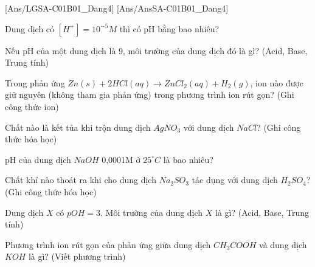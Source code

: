 [Ans/LGSA-C01B01_Dang4]
[Ans/AnsSA-C01B01_Dang4]
\begin{bt}
	Dung dịch có $[H^+] = 10^{-5} M$ thì có pH bằng bao nhiêu?
\end{bt}
\begin{bt}
	Nếu pH của một dung dịch là 9, môi trường của dung dịch đó là gì? (Acid, Base, Trung tính)
\end{bt}
\begin{bt}
    Trong phản ứng $Zn(s) + 2HCl(aq) \rightarrow ZnCl_2(aq) + H_2(g)$, ion nào được giữ nguyên (không tham gia phản ứng) trong phương trình ion rút gọn? (Ghi công thức ion)
\end{bt}
\begin{bt}
    Chất nào là kết tủa khi trộn dung dịch $AgNO_3$ với dung dịch $NaCl$? (Ghi công thức hóa học)
\end{bt}
\begin{bt}
    pH của dung dịch $NaOH$ 0,0001M ở $25^\circ C$ là bao nhiêu?
\end{bt}
\begin{bt}
    Chất khí nào thoát ra khi cho dung dịch $Na_2SO_3$ tác dụng với dung dịch $H_2SO_4$? (Ghi công thức hóa học)
\end{bt}
\begin{bt}
    Dung dịch $X$ có $pOH = 3$. Môi trường của dung dịch $X$ là gì? (Acid, Base, Trung tính)
\end{bt}
\begin{bt}
    Phương trình ion rút gọn của phản ứng giữa dung dịch $CH_3COOH$ và dung dịch $KOH$ là gì? (Viết phương trình)
\end{bt}
